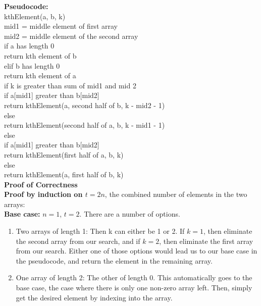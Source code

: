 \begin{qunlist}
{\begin{enumerate}
\end{enumerate}
\textbf{Pseudocode:} \\
kthElement(a, b, k)\\
\tab mid1 = middle element of first array\\
\tab mid2 = middle element of the second array\\
\tab if a has length 0\\
\tab \tab return kth element of b\\
\tab elif b has length 0\\
\tab \tab return kth element of a\\
\tab \tab if k is greater than sum of mid1 and mid 2\\
\tab \tab \tab if a[mid1] greater than b[mid2]\\
\tab \tab \tab \tab return kthElement(a, second half of b, k - mid2 - 1)\\
\tab \tab \tab else \\
\tab \tab \tab \tab return kthElement(second half of a, b, k - mid1 - 1)\\
\tab \tab else\\
\tab \tab \tab if a[mid1] greater than b[mid2]\\
\tab \tab \tab \tab return kthElement(first half of a, b, k)\\
\tab \tab \tab else \\
\tab \tab \tab \tab return kthElement(a, first half of b, k)\\
\textbf{Proof of Correctness} \\
\textbf{Proof by induction on $t=2n$}, the combined number of elements in the two arrays: \\
\textbf{Base case:} $n=1$, $t=2$. There are a number of options.
\begin{enumerate}
\item 
Two arrays of length 1: Then k can either be 1 or 2. If $k=1$, then eliminate the second array from our search, and if $k=2$, then eliminate the first array from our search. Either one of those options would lead us to our base case in the pseudocode, and return the element in the remaining array. 
\item 
One array of length 2: The other of length 0. This automatically goes to the base case, the case where there is only one non-zero array left. Then, simply get the desired element by indexing into the array. 
\end{enumerate}

}
\end{qunlist}

